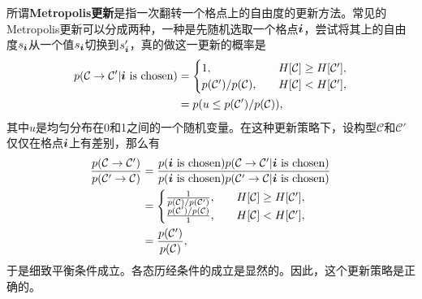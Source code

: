 \documentclass[hyperref, UTF8]{ctexart}
\newcommand*{\concept}[1]{{\textbf{#1}}}
\begin{document}
所谓\concept{Metropolis更新}是指一次翻转一个格点上的自由度的更新方法。常见的Metropolis更新可以分成两种，一种是先随机选取一个格点$\vb*{i}$，尝试将其上的自由度$s_{\vb*{i}}$从一个值$s_{\vb*{i}}$切换到$s_{\vb*{i}}'$，真的做这一更新的概率是
\begin{equation}
    \begin{aligned}
        p(\mathcal{C} \to \mathcal{C}' | \text{$\vb*{i}$ is chosen}) &= \begin{cases}
            1, &\quad H[\mathcal{C}] \geq H[\mathcal{C}'], \\
            {p(\mathcal{C}')} / {p(\mathcal{C})}, &\quad H[\mathcal{C}] < H[\mathcal{C}'],
        \end{cases} \\
        &= p(u \leq p(\mathcal{C}') / p(\mathcal{C}) ),
    \end{aligned}
    \label{eq:metropolis-update}
\end{equation}
其中$u$是均匀分布在0和1之间的一个随机变量。在这种更新策略下，设构型$\mathcal{C}$和$\mathcal{C}'$仅仅在格点$\vb*{i}$上有差别，那么有
\begin{equation}
    \begin{aligned}
        \frac{p(\mathcal{C} \to \mathcal{C}')}{p(\mathcal{C}' \to \mathcal{C})} &= \frac{p(\text{$\vb*{i}$ is chosen}) p(\mathcal{C} \to \mathcal{C}' | \text{$\vb*{i}$ is chosen})}{p(\text{$\vb*{i}$ is chosen}) p(\mathcal{C}' \to \mathcal{C} | \text{$\vb*{i}$ is chosen})} \\
        &= \begin{cases}
            \frac{1}{p(\mathcal{C}) / p(\mathcal{C}')} , &\quad H[\mathcal{C}] \geq H[\mathcal{C}'], \\
            \frac{p(\mathcal{C}') / p(\mathcal{C})}{1}, &\quad H[\mathcal{C}] < H[\mathcal{C}'], 
        \end{cases} \\
        &= \frac{p(\mathcal{C}')}{p(\mathcal{C})},
    \end{aligned}
\end{equation}
于是细致平衡条件成立。各态历经条件的成立是显然的。因此，这个更新策略是正确的。
\end{document}
